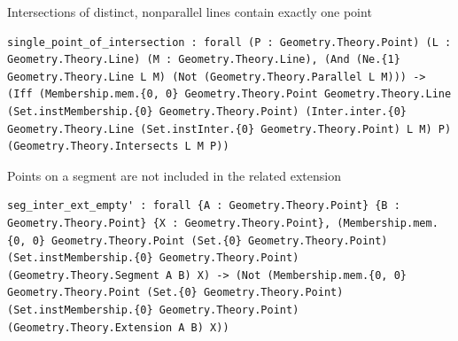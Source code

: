 \begin{theorem}
  \label{Geometry.Theory.Intersection.single_point_of_intersection}
  \leanok
  Intersections of distinct, nonparallel lines contain exactly one point 
\begin{verbatim}single_point_of_intersection : forall (P : Geometry.Theory.Point) (L : Geometry.Theory.Line) (M : Geometry.Theory.Line), (And (Ne.{1} Geometry.Theory.Line L M) (Not (Geometry.Theory.Parallel L M))) -> (Iff (Membership.mem.{0, 0} Geometry.Theory.Point Geometry.Theory.Line (Set.instMembership.{0} Geometry.Theory.Point) (Inter.inter.{0} Geometry.Theory.Line (Set.instInter.{0} Geometry.Theory.Point) L M) P) (Geometry.Theory.Intersects L M P))\end{verbatim}
\end{theorem}

\begin{theorem}
  \label{Geometry.Theory.Intersection.seg_inter_ext_empty'}
  \leanok
  Points on a segment are not included in the related extension 
\begin{verbatim}seg_inter_ext_empty' : forall {A : Geometry.Theory.Point} {B : Geometry.Theory.Point} {X : Geometry.Theory.Point}, (Membership.mem.{0, 0} Geometry.Theory.Point (Set.{0} Geometry.Theory.Point) (Set.instMembership.{0} Geometry.Theory.Point) (Geometry.Theory.Segment A B) X) -> (Not (Membership.mem.{0, 0} Geometry.Theory.Point (Set.{0} Geometry.Theory.Point) (Set.instMembership.{0} Geometry.Theory.Point) (Geometry.Theory.Extension A B) X))\end{verbatim}
\end{theorem}

